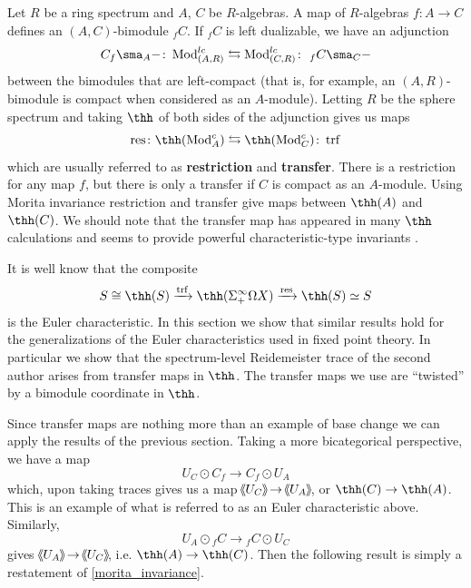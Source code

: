 \documentclass[11pt]{amsart}
\newcommand{\xto}{\xrightarrow}
\def\shvar#1#2{{\ensuremath{%
  \hspace{1mm}\makebox[-1mm]{$#1\langle$}\makebox[0mm]{$#1\langle$}\hspace{1mm}%
  {#2}%
  \makebox[1mm]{$#1\rangle$}\makebox[0mm]{$#1\rangle$}%
}}}
\def\sh{\shvar{}}
\begin{document}
Let $R$ be a ring spectrum and $A$, $C$ be $R$-algebras.  A map of $R$-algebras $f\colon  A \to C$ defines an $(A, C)$-bimodule $_fC$.  If 
$_fC$
 is left dualizable, we have 
an adjunction
\[
 C_f \sma_A - \colon  \operatorname{Mod}^{lc}_{(A, R)} \leftrightarrows \operatorname{Mod}^{lc}_{(C, R)} \colon  \ _f C \sma_C - 
\]
between the bimodules that are left-compact (that is, for example, an $(A, R)$-bimodule is compact when considered as an $A$-module). Letting $R$ be the sphere spectrum and taking $\thh$ of both sides of the adjunction gives us maps
\[
\operatorname{res}\colon  \thh(\operatorname{Mod}^c_{A}) \leftrightarrows \thh(\operatorname{Mod}^c_C) \colon  \operatorname{trf} 
\]
which are usually referred to as \textbf{restriction} and \textbf{transfer}. There is a restriction for any map $f$, but there is only a transfer if 
$C$ is compact as an $A$-module. Using Morita invariance 
restriction and transfer  give maps between $\thh(A)$ and $\thh(C)$. 
We should note that the transfer map has appeared in many $\thh$ calculations and seems to provide powerful characteristic-type invariants \cite{schlichtkrull_1, schlichtkrull_2, bentzen_madsen}. 



It is well know that the composite
\[
S \cong \thh(S) \xrightarrow{\operatorname{trf}} \thh(\Sigma^\infty_+ \Omega X) \xto{\operatorname{res} }  \thh (S) \simeq S 
\]
is the Euler characteristic.  In this section we show that similar results hold for the generalizations of the Euler characteristics used in fixed point theory.
In particular we show that the spectrum-level Reidemeister trace of the second author \cite{p:thesis,p:coincidence} arises from transfer maps in $\thh$. The transfer maps we use are ``twisted'' by a bimodule coordinate in $\thh$. 

Since transfer maps are nothing more than an example of base change we can apply the results of the previous section.
Taking a more bicategorical perspective,
we have a map
\begin{equation}\label{eq:base_change_trace_1}
U_C \odot   C_f \to   C_f \odot U_A  
\end{equation}
which, upon taking traces gives us a map $\sh{U_C} \to \sh{U_A}$, or $\thh(C) \to \thh(A)$. This is an example of what is referred to as an Euler characteristic above. Similarly,
\begin{equation}\label{eq:base_change_trace_2}
U_A \odot {_f C}\to {_f C} \odot U_C
\end{equation}
gives $\sh{U_A} \to \sh{U_C}$, i.e. $\thh(A) \to \thh(C)$. 
Then the following result  is simply  a restatement of \cref{morita_invariance}. 
\end{document}
